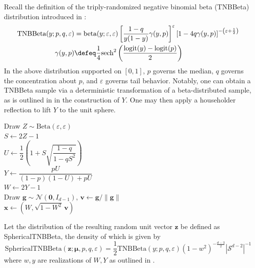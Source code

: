 Recall the definition of the triply-randomized negative binomial beta (TNBBeta)
distribution introduced in \citep{lederman2026triplyrandomizednegativebinomialbeta}:
\begin{align*}
    \text{TNBBeta}(y; p, q, \varepsilon) &= \text{beta}(y; \varepsilon, \varepsilon)\left[\frac{1 - q}{y(1 - y)}\gamma(y, p)\right]^{\varepsilon}\left[1 - 4q\gamma(y, p)\right]^{-\left(\varepsilon + \frac{1}{2}\right)} \\
    \gamma(y, p) &\defeq \frac{1}{4}\text{sech}^2\left(\frac{\text{logit}(y) - \text{logit}(p)}{2}\right)
\end{align*}
In the above distribution supported on $[0, 1]$, $p$ governs the median, $q$
governs the concentration about $p$, and $\varepsilon$ governs tail behavior.
Notably, one can obtain a TNBBeta sample via a deterministic transformation of
a beta-distributed sample, as is outlined in  in the construction of $Y$.
One may then apply a householder reflection to lift $Y$ to the unit sphere.
\begin{algorithm}[H]
    \caption{Sampling $\mathbf{z} \sim \mathrm{SphericalTNBBeta}(\boldsymbol{\mu}, p, q, \varepsilon)$}
    \label{alg:tnbbeta-sample}
    \KwIn{Mean direction $\boldsymbol{\mu} \in S^{d-1}$, median $p \in (0, 1)$, concentration
        $q \in [0, 1)$, boundary parameter $\varepsilon > 0$.}
    Draw $Z \sim \mathrm{Beta}(\varepsilon, \varepsilon)$ \\
    $S \leftarrow 2Z - 1$ \\
    $U \leftarrow \dfrac{1}{2}\left(1 + S\sqrt{\dfrac{1 - q}{1 - qS^2}}\right)$ \\
    $Y \leftarrow \dfrac{pU}{(1 - p)(1 - U) + pU}$ \\
    $W \leftarrow 2Y - 1$ \\
    Draw $\mathbf{g} \sim \mathcal{N}(\mathbf{0}, I_{d-1})$, $\mathbf{v} \leftarrow \mathbf{g} / \|\mathbf{g}\|$ \\
    $\mathbf{x} \leftarrow \left(W, \sqrt{1 - W^2}\,\mathbf{v}\right)$ \\
\end{algorithm}
Let the distribution of the resulting random unit vector $\mathbf{z}$ be defined
as SphericalTNBBeta, the density of which is given by
\[
    \text{SphericalTNBBeta}(\mathbf{z}; \boldsymbol{\mu}, p, q, \varepsilon) = \frac{1}{2}\text{TNBBeta}(y; p, q, \varepsilon)\left(1 - w^2\right)^{-\frac{d - 3}{2}}\left|\mathcal{S}^{d - 2}\right|^{-1}
\]
where $w, y$ are realizations of $W, Y$ as outlined in .

